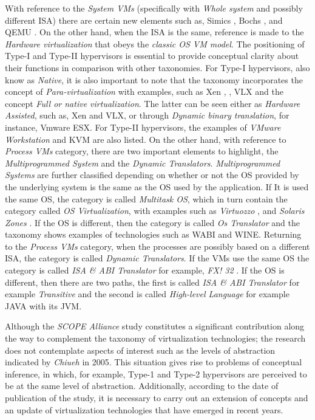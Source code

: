 	With reference to the \textit{System VMs} (specifically with \textit{Whole system} and possibly different ISA) there are certain new elements such as, Simics \cite{Magnusson2002}, Bochs \cite{Bochs2018}, and QEMU \cite {QEMU2018}. On the other hand, when the ISA is the same, reference is made to the \textit{Hardware virtualization} that obeys the \textit{classic OS VM model}. The positioning of Type-I and Type-II hypervisors is essential to provide conceptual clarity about their functions in comparison with other taxonomies. For Type-I hypervisors, also know as \textit{Native}, it is also important to note that the taxonomy incorporates the concept of \textit{Para-virtualization} with examples, such as Xen \cite{Xen2018Website}, \cite{Xen2018WebsiteCambridge}, VLX \cite{Armand2009} and the concept \textit{Full or native virtualization}. The latter can be seen either as \textit{Hardware Assisted}, such as, Xen and VLX,  or through \textit{Dynamic binary translation}, for instance, Vmware ESX. For Type-II hypervisors, the examples of \textit{VMware Workstation} \cite{VMware2018Website} and KVM \cite{KVM} are also listed. On the other hand, with reference to \textit{Process VMs} category, there are two important elements to highlight,  the \textit{Multiprogrammed System} and the \textit{Dynamic Translators}. \textit{Multiprogrammed Systems} are further classified depending on whether or not the OS provided by the underlying system is the same as the OS used by the application. If It is used the same OS, the category is called \textit{Multitask OS}, which in turn contain the category called \textit{OS Virtualization}, with examples such as \textit{Virtuozzo} \cite{OpenVZ}, \cite{Virtuozzo} and \textit{Solaris Zones} \cite{SolarisZones}. If the OS is different, then the category is called \textit{Os Translator} and the taxonomy shows examples of technologies such as WABI and WINE. Returning to the \textit{Process VMs} category, when the processes are possibly based on a different ISA, the category is called \textit{Dynamic Translators}. If the VMs use the same OS the category is called  \textit{ISA \& ABI Translator} for example, \textit{FX! 32} \cite{Chernoff1998}. If the OS is different, then there are two paths, the first is called \textit{ISA \& ABI Translator} for example \textit{Transitive} \cite {Transitive} and the second is called \textit{High-level Language} for example JAVA with its JVM.
	
	Although the \textit{SCOPE Alliance} study  \cite{SCOPEAlliance2008} constitutes a significant contribution along the way to complement the taxonomy of virtualization technologies; the research does not contemplate aspects of interest such as the levels of abstraction indicated by \textit{Chiueh} \cite{ Chiueh2005} in 2005. This situation gives rise to problems of conceptual inference, in which, for example, Type-1 and Type-2 hypervisors are perceived to be at the same level of abstraction. Additionally, according to the date of publication of the study, it is necessary to carry out an extension of concepts and an update of virtualization technologies that have emerged in recent years.
	